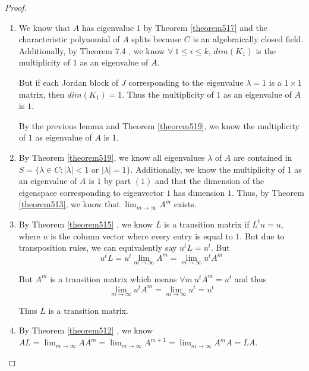 \documentclass{amsart}
\theoremstyle{definition}
\theoremstyle{remark}
\numberwithin{equation}{section}
\begin{document}
\begin{proof}

\begin{enumerate}

	\item
			We know that $A$ has eigenvalue $1$ by Theorem \ref{theorem517} and the characteristic polynomial of $A$ splits because $C$ is an algebraically closed field. Additionally, by Theorem 7.4 \cite{friedberg2003linear}, we know $\forall\ 1 \leq i \leq k$, $dim(K_{1})$ is the multiplicity of $1$ as an eigenvalue of $A$.  


			But if each Jordan block of $J$ corresponding to the eigenvalue $\lambda = 1$ is a $1 \times 1$ matrix, then $dim(K_1) = 1$.
			Thus the multiplicity of $1$ as an eigenvalue of $A$ is $1$.


			By the previous lemma and Theorem \ref{theorem519}, we know the multiplicity of $1$ as eigenvalue of $A$ is 1.


	\item 
			By Theorem \ref{theorem519}, we know all eigenvalues $\lambda$ of $A$ are contained in $S = \{ \lambda \in C: |\lambda| < 1$ or $|\lambda| = 1\}$.
			Additionally, we know the multiplicity of $1$ as an eigenvalue of $A$ is $1$ by part $(1)$ and that the dimension of the eigenspace corresponding to eigenvector $1$ has dimension $1$.
			Thus, by Theorem \ref{theorem513}, we know that $\lim_{m \to \infty} A^m$ exists.

	\item 
			By Theorem \ref{theorem515} , we know $L$ is a transition matrix if $L^tu = u$, where $u$ is the column vector where every entry is equal to $1$.
			But due to transposition rules, we can equivalently say  $u^tL = u^t$.
			But 
			$$u^tL = u^t \lim_{m \to \infty} A^m = \lim_{m \to \infty} u^t A^m$$

			But $A^m$ is a transition matrix which means $\forall m\ u^t A^m = u^t$ and thus
			$$\lim_{m \to \infty} u^t A^m = \lim_{m \to \infty} u^t = u^t $$

			Thus $L$ is a transition matrix.


	\item 

			By Theorem \ref{theorem512} \cite{friedberg2003linear}, we know $AL = \lim_{m \to \infty} A A^m = \lim_{m \to \infty} A^{m+1} = \lim_{m \to \infty} A^mA  = LA$.


\end{enumerate}
\end{proof}
\end{document}
